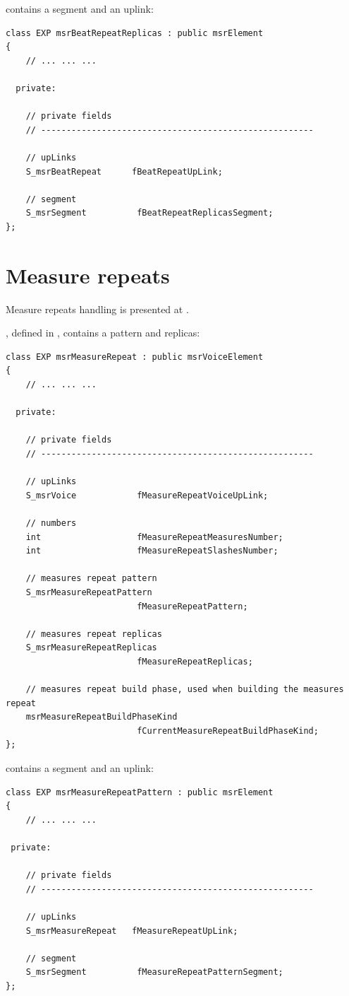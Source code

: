  contains a segment and an uplink:
\begin{lstlisting}[language=CPlusPlus]
class EXP msrBeatRepeatReplicas : public msrElement
{
	// ... ... ...

  private:

    // private fields
    // ------------------------------------------------------

    // upLinks
    S_msrBeatRepeat      fBeatRepeatUpLink;

    // segment
    S_msrSegment          fBeatRepeatReplicasSegment;
};
\end{lstlisting}


\section{Measure repeats}\label{Measure repeats}

Measure repeats handling is presented at .

, defined in , contains a pattern and replicas:
\begin{lstlisting}[language=CPlusPlus]
class EXP msrMeasureRepeat : public msrVoiceElement
{
	// ... ... ...

  private:

    // private fields
    // ------------------------------------------------------

    // upLinks
    S_msrVoice            fMeasureRepeatVoiceUpLink;

    // numbers
    int                   fMeasureRepeatMeasuresNumber;
    int                   fMeasureRepeatSlashesNumber;

    // measures repeat pattern
    S_msrMeasureRepeatPattern
                          fMeasureRepeatPattern;

    // measures repeat replicas
    S_msrMeasureRepeatReplicas
                          fMeasureRepeatReplicas;

    // measures repeat build phase, used when building the measures repeat
    msrMeasureRepeatBuildPhaseKind
                          fCurrentMeasureRepeatBuildPhaseKind;
};
\end{lstlisting}

 contains a segment and an uplink:
\begin{lstlisting}[language=CPlusPlus]
class EXP msrMeasureRepeatPattern : public msrElement
{
 	// ... ... ...

 private:

    // private fields
    // ------------------------------------------------------

    // upLinks
    S_msrMeasureRepeat   fMeasureRepeatUpLink;

    // segment
    S_msrSegment          fMeasureRepeatPatternSegment;
};
\end{lstlisting}

